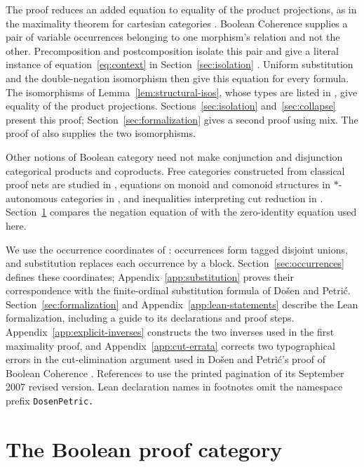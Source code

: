 \documentclass[11pt]{article}
\begin{document}
The proof reduces an added equation to equality of the product
projections, as in the maximality theorem for cartesian categories
\cite[\S5]{DPCartesian}. Boolean Coherence supplies a pair of
variable occurrences belonging to one morphism's relation and not the
other. Precomposition and postcomposition isolate this pair and
give a literal instance of equation~\eqref{eq:context} in
Section~\ref{sec:isolation} \cite[\S9.7, pp.~215--216]{DP}.
Uniform substitution and the double-negation isomorphism then give
this equation for every formula.
The isomorphisms of Lemma~\ref{lem:structural-isos}, whose types are
listed in \cite[\S12.5, p.~294]{DP}, give equality of the product
projections. Sections~\ref{sec:isolation}
and~\ref{sec:collapse} present this proof; Section~\ref{sec:formalization}
gives a second proof using mix. The proof of
\cite[Lemma~7]{DPIsomorphic} also supplies the two isomorphisms.

Other notions of Boolean category need not make conjunction and
disjunction categorical products and coproducts. Free categories constructed from classical proof nets
are studied in \cite[Theorem~3.5.4]{LSFree}, equations on monoid
and comonoid structures in $*$-autonomous categories in
\cite{Strassburger}, and inequalities interpreting cut reduction
in \cite{FP}. Section~\ref{sec:category} compares the negation
equation of \cite{FP} with the zero-identity equation used here.

We use the occurrence coordinates of \cite[\S9]{Notation}:
occurrences form tagged disjoint unions, and substitution replaces
each occurrence by a block. Section~\ref{sec:occurrences} defines
these coordinates; Appendix~\ref{app:substitution} proves their
correspondence with the finite-ordinal substitution formula of
Do\v{s}en and Petri\'c. Section~\ref{sec:formalization} and
Appendix~\ref{app:lean-statements} describe the Lean formalization,
including a guide to its declarations and proof steps.
Appendix~\ref{app:explicit-inverses} constructs the two inverses
used in the first maximality proof, and
Appendix~\ref{app:cut-errata} corrects two typographical errors
in the cut-elimination argument used in Do\v{s}en and Petri\'c's
proof of Boolean Coherence \cite{DP}.
References to \cite{DP} use the printed pagination of its
September 2007 revised version. Lean declaration names in footnotes
omit the namespace prefix \texttt{DosenPetric.}

\section{The Boolean proof category}\label{sec:category}
\end{document}
